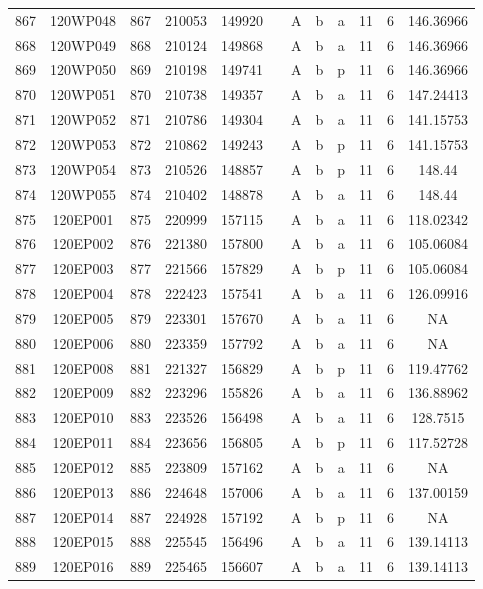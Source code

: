 \begin{tabular}{|*{12}{c|}}
867 & 120WP048 & 867 & 210053 & 149920 &  & A & b & a & 11 & 6 & 146.36966 \\ 
868 & 120WP049 & 868 & 210124 & 149868 &  & A & b & a & 11 & 6 & 146.36966 \\ 
869 & 120WP050 & 869 & 210198 & 149741 &  & A & b & p & 11 & 6 & 146.36966 \\ 
870 & 120WP051 & 870 & 210738 & 149357 &  & A & b & a & 11 & 6 & 147.24413 \\ 
871 & 120WP052 & 871 & 210786 & 149304 &  & A & b & a & 11 & 6 & 141.15753 \\ 
872 & 120WP053 & 872 & 210862 & 149243 &  & A & b & p & 11 & 6 & 141.15753 \\ 
873 & 120WP054 & 873 & 210526 & 148857 &  & A & b & p & 11 & 6 & 148.44 \\ 
874 & 120WP055 & 874 & 210402 & 148878 &  & A & b & a & 11 & 6 & 148.44 \\ 
875 & 120EP001 & 875 & 220999 & 157115 &  & A & b & a & 11 & 6 & 118.02342 \\ 
876 & 120EP002 & 876 & 221380 & 157800 &  & A & b & a & 11 & 6 & 105.06084 \\ 
877 & 120EP003 & 877 & 221566 & 157829 &  & A & b & p & 11 & 6 & 105.06084 \\ 
878 & 120EP004 & 878 & 222423 & 157541 &  & A & b & a & 11 & 6 & 126.09916 \\ 
879 & 120EP005 & 879 & 223301 & 157670 &  & A & b & a & 11 & 6 & NA \\ 
880 & 120EP006 & 880 & 223359 & 157792 &  & A & b & a & 11 & 6 & NA \\ 
881 & 120EP008 & 881 & 221327 & 156829 &  & A & b & p & 11 & 6 & 119.47762 \\ 
882 & 120EP009 & 882 & 223296 & 155826 &  & A & b & a & 11 & 6 & 136.88962 \\ 
883 & 120EP010 & 883 & 223526 & 156498 &  & A & b & a & 11 & 6 & 128.7515 \\ 
884 & 120EP011 & 884 & 223656 & 156805 &  & A & b & p & 11 & 6 & 117.52728 \\ 
885 & 120EP012 & 885 & 223809 & 157162 &  & A & b & a & 11 & 6 & NA \\ 
886 & 120EP013 & 886 & 224648 & 157006 &  & A & b & a & 11 & 6 & 137.00159 \\ 
887 & 120EP014 & 887 & 224928 & 157192 &  & A & b & p & 11 & 6 & NA \\ 
888 & 120EP015 & 888 & 225545 & 156496 &  & A & b & a & 11 & 6 & 139.14113 \\ 
889 & 120EP016 & 889 & 225465 & 156607 &  & A & b & a & 11 & 6 & 139.14113 \\ 

\end{tabular}
